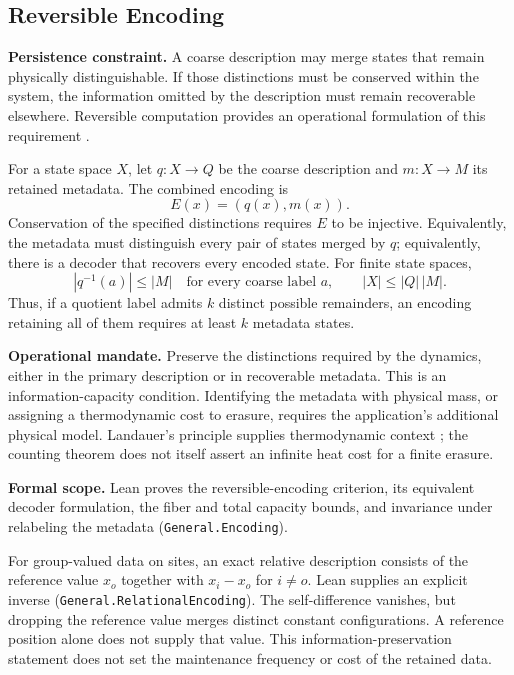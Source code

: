 \subsection{Reversible Encoding}
\label{rule_reversible_encoding}

\textbf{Persistence constraint.} A coarse description may merge states that remain physically distinguishable. If those distinctions must be conserved within the system, the information omitted by the description must remain recoverable elsewhere. Reversible computation provides an operational formulation of this requirement \cite{bennett_thermodynamics_1982}.

For a state space $X$, let $q:X\to Q$ be the coarse description and $m:X\to M$ its retained metadata. The combined encoding is
\begin{equation}
    E(x)=(q(x),m(x)).
\end{equation}
Conservation of the specified distinctions requires $E$ to be injective. Equivalently, the metadata must distinguish every pair of states merged by $q$; equivalently, there is a decoder that recovers every encoded state. For finite state spaces,
\begin{equation}
    |q^{-1}(a)|\leq |M| \quad\text{for every coarse label }a,
    \qquad |X|\leq |Q|\,|M|.
\end{equation}
Thus, if a quotient label admits $k$ distinct possible remainders, an encoding retaining all of them requires at least $k$ metadata states.

\textbf{Operational mandate.} Preserve the distinctions required by the dynamics, either in the primary description or in recoverable metadata. This is an information-capacity condition. Identifying the metadata with physical mass, or assigning a thermodynamic cost to erasure, requires the application's additional physical model. Landauer's principle supplies thermodynamic context \cite{landauer_irreversibility_1961}; the counting theorem does not itself assert an infinite heat cost for a finite erasure.

\textbf{Formal scope.} Lean proves the reversible-encoding criterion, its equivalent decoder formulation, the fiber and total capacity bounds, and invariance under relabeling the metadata (\texttt{General.Encoding}).

For group-valued data on sites, an exact relative description consists of the
reference value $x_o$ together with $x_i-x_o$ for $i\ne o$. Lean supplies an
explicit inverse (\texttt{General.RelationalEncoding}). The self-difference
vanishes, but dropping the reference value merges distinct constant
configurations. A reference position alone does not supply that value. This
information-preservation statement does not set the maintenance frequency or
cost of the retained data.

